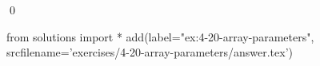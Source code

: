 
\begin{ex}
  \label{ex:4-20-array-parameters}
  
  \qed
\end{ex}
\begin{python0}
from solutions import *
add(label="ex:4-20-array-parameters",
    srcfilename='exercises/4-20-array-parameters/answer.tex')
\end{python0}
